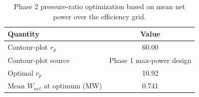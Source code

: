 \begin{table}[htbp]
    \centering
    \caption{Phase 2 pressure-ratio optimization based on mean net power over the efficiency grid.}
    \label{tab:phase2_mean_power_optimization}
    \begin{tabular}{lc}
        \hline
        Quantity & Value \\
        \hline
        Contour-plot $r_p$ & 60.00 \\
        Contour-plot source & Phase 1 max-power design \\
        Optimal $r_p$ & 10.92 \\
        Mean $\dot{W}_{net}$ at optimum (MW) & 0.741 \\
        \hline
    \end{tabular}
\end{table}